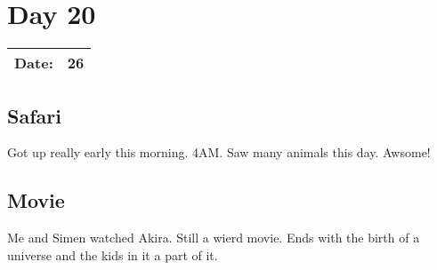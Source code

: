 \section{Day 20}
\begin{tabular}{|c|c|}
\hline
Date: & 26 \\
\hline
\end{tabular}
\subsection{Safari}
Got up really early this morning. 4AM. 
Saw many animals this day. Awsome!
\subsection{Movie}
Me and Simen watched Akira. Still a wierd movie.
Ends with the birth of a universe and the kids in it a part of it.

